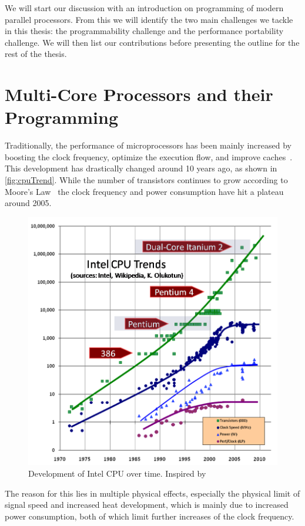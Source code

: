 \noindent
We will start our discussion with an introduction on programming of modern parallel processors.
From this we will identify the two main challenges we tackle in this thesis:
the programmability challenge and the performance portability challenge.
We will then list our contributions before presenting the outline for the rest of the thesis.

\section{Multi-Core Processors and their Programming}

Traditionally, the performance of microprocessors has been mainly increased by boosting the clock frequency, optimize the execution flow, and improve caches~\cite{Sutter2005}.
This development has drastically changed around 10 years ago, as shown in \autoref{fig:cpuTrend}.
While the number of transistors continues to grow according to Moore's Law~\cite{Moore1998} the clock frequency and power consumption have hit a plateau around 2005.
\begin{figure}
  \centering
  \includegraphics[width=.9\linewidth]{Figures/CPUTrend.png}
  \caption{Development of Intel CPU over time. Inspired by~\cite{Sutter2005}}
  \label{fig:cpuTrend}
\end{figure} 
The reason for this lies in multiple physical effects, especially the physical limit of signal speed and increased heat development, which is mainly due to increased power consumption, both of which limit further increases of the clock frequency.
